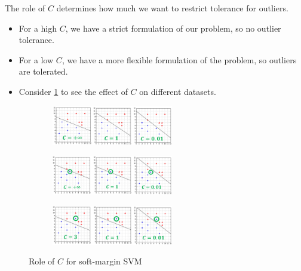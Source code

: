 The role of $C$ determines how much we want to restrict tolerance for outliers. 
\begin{itemize}
  \item For a high $C$, we have a strict formulation of our problem, so no outlier tolerance.
  \item For a low $C$, we have a more flexible formulation of the problem, so outliers are tolerated.
  \item Consider \ref{fig:5_c} to see the effect of $C$ on different datasets.
\end{itemize}

\begin{figure}[H]
  \centering
  \begin{subfigure}{\textwidth}
    \centering
    \includegraphics[width=0.58\textwidth]{assets/svm/sm__c_separable.png}
  \end{subfigure}

  \vspace*{0.5cm}

  \begin{subfigure}{\textwidth}
    \centering
    \includegraphics[width=0.58\textwidth]{assets/svm/sm__c_1_outlier.png}
  \end{subfigure}

  \vspace*{0.5cm}

  \begin{subfigure}{\textwidth}
    \centering
    \includegraphics[width=0.58\textwidth]{assets/svm/sm__c_not_separable.png}
  \end{subfigure}

  \caption{Role of $C$ for soft-margin SVM}
  \label{fig:5_c}
\end{figure}